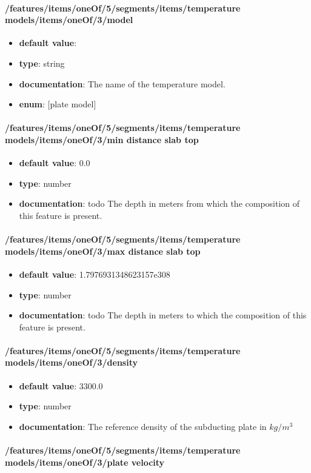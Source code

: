 \paragraph{/features/items/oneOf/5/segments/items/temperature models/items/oneOf/3/model}
\begin{itemize}\item {\bf default value}: 
\item {\bf type}: string
\item {\bf documentation}: The name of the temperature model.
\item {\bf enum}: [plate model]\end{itemize}\paragraph{/features/items/oneOf/5/segments/items/temperature models/items/oneOf/3/min distance slab top}
\begin{itemize}\item {\bf default value}: 0.0
\item {\bf type}: number
\item {\bf documentation}: todo The depth in meters from which the composition of this feature is present.
\end{itemize}\paragraph{/features/items/oneOf/5/segments/items/temperature models/items/oneOf/3/max distance slab top}
\begin{itemize}\item {\bf default value}: 1.7976931348623157e308
\item {\bf type}: number
\item {\bf documentation}: todo The depth in meters to which the composition of this feature is present.
\end{itemize}\paragraph{/features/items/oneOf/5/segments/items/temperature models/items/oneOf/3/density}
\begin{itemize}\item {\bf default value}: 3300.0
\item {\bf type}: number
\item {\bf documentation}: The reference density of the subducting plate in $kg/m^3$
\end{itemize}\paragraph{/features/items/oneOf/5/segments/items/temperature models/items/oneOf/3/plate velocity}
